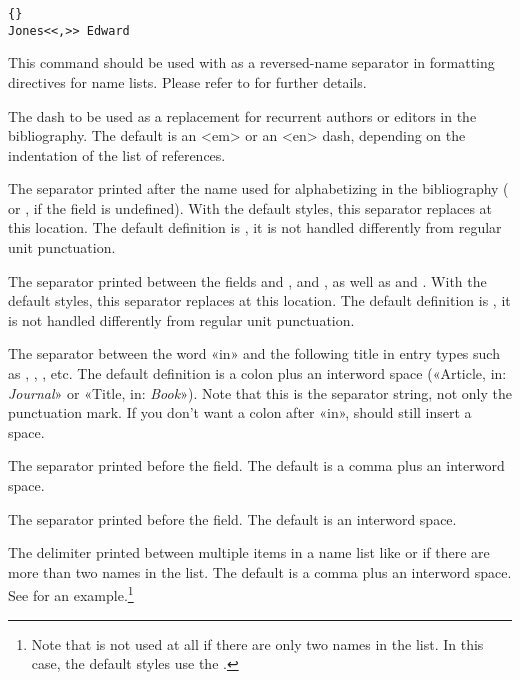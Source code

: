 \documentclass{ltxdockit}[2011/03/25]
\begin{document}
\begin{ltxsyntax}
\begin{lstlisting}[style=latex]{}
Jones<<,>> Edward
\end{lstlisting}

This command should be used with  as a reversed-name separator in formatting directives for name lists. Please refer to  for further details.

The dash to be used as a replacement for recurrent authors or editors in the bibliography. The default is an <em> or an <en> dash, depending on the indentation of the list of references.

The separator printed after the name used for alphabetizing in the bibliography ( or , if the  field is undefined). With the default styles, this separator replaces  at this location. The default definition is , \ie it is not handled differently from regular unit punctuation.

The separator printed between the fields  and ,  and , as well as  and . With the default styles, this separator replaces  at this location. The default definition is , \ie it is not handled differently from regular unit punctuation.

The separator between the word «in» and the following title in entry types such as , , , etc. The default definition is a colon plus an interword space (\eg «Article, in: \emph{Journal}» or «Title, in: \emph{Book}»). Note that this is the separator string, not only the punctuation mark. If you don't want a colon after «in»,  should still insert a space.

The separator printed before the  field. The default is a comma plus an interword space.

The separator printed before the  field. The default is an interword space.

The delimiter printed between multiple items in a name list like  or  if there are more than two names in the list. The default is a comma plus an interword space. See  for an example.\footnote{Note that  is not used at all if there are only two names in the list. In this case, the default styles use the .}


\end{ltxsyntax}
\end{document}
